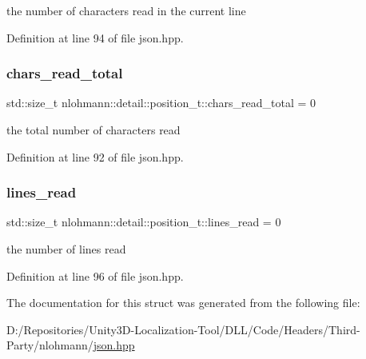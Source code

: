 the number of characters read in the current line 



Definition at line 94 of file json.\+hpp.

\mbox{\label{structnlohmann_1_1detail_1_1position__t_a94cf85cd91d478c20ae143eba906ea1a}} 
\subsubsection{\texorpdfstring{chars\_read\_total}{chars\_read\_total}}
{\footnotesize\ttfamily std\+::size\+\_\+t nlohmann\+::detail\+::position\+\_\+t\+::chars\+\_\+read\+\_\+total = 0}



the total number of characters read 



Definition at line 92 of file json.\+hpp.

\mbox{\label{structnlohmann_1_1detail_1_1position__t_a4bbad8bc2c0d17c1b61c3ce729908b71}} 
\subsubsection{\texorpdfstring{lines\_read}{lines\_read}}
{\footnotesize\ttfamily std\+::size\+\_\+t nlohmann\+::detail\+::position\+\_\+t\+::lines\+\_\+read = 0}



the number of lines read 



Definition at line 96 of file json.\+hpp.



The documentation for this struct was generated from the following file\+:\begin{DoxyCompactItemize}
\item 
D\+:/\+Repositories/\+Unity3\+D-\/\+Localization-\/\+Tool/\+D\+L\+L/\+Code/\+Headers/\+Third-\/\+Party/nlohmann/\mbox{\hyperlink{json_8hpp}{json.\+hpp}}\end{DoxyCompactItemize}
